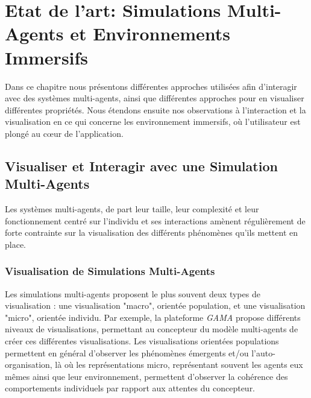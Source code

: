 \chapter{Etat de l'art: Simulations Multi-Agents et Environnements Immersifs}
\label{ChapitreEAVR}

	Dans ce chapitre nous présentons différentes approches utilisées afin d'interagir avec des systèmes multi-agents, ainsi que différentes approches pour en visualiser différentes propriétés. Nous étendons ensuite nos observations à l'interaction et la visualisation en ce qui concerne les environnement immersifs, où l'utilisateur est plongé au cœur de l'application.
	

	\section{Visualiser et Interagir avec une Simulation Multi-Agents}
		
	Les systèmes multi-agents, de part leur taille, leur complexité et leur fonctionnement centré sur l'individu et ses interactions amènent régulièrement de forte contrainte sur la visualisation des différents phénomènes qu'ils mettent en place.		
		
		\subsection{Visualisation de Simulations Multi-Agents}
		
		Les simulations multi-agents proposent le plus souvent deux types de visualisation : une visualisation "macro", orientée population, et une visualisation "micro", orientée individu. Par exemple, la plateforme \textit{GAMA} \cite{taillandier_building_2019} propose différents niveaux de visualisations, permettant au concepteur du modèle multi-agents de créer ces différentes visualisations.		
		Les visualisations orientées populations permettent en général d'observer les phénomènes émergents et/ou l'auto-organisation, là où les représentations micro, représentant souvent les agents eux mêmes ainsi que leur environnement, permettent d'observer la cohérence des comportements individuels par rapport aux attentes du concepteur.
		

